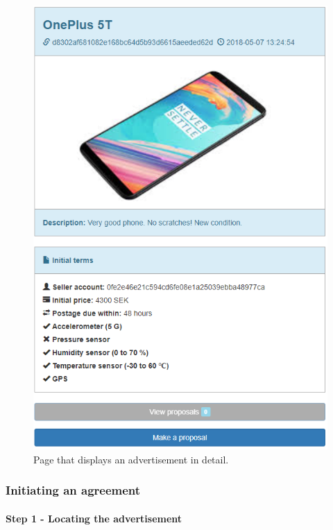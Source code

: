 \begin{figure}[H]
\centering
\includegraphics[scale=0.58]{app_screens/item_display.png}
\caption{Page that displays an advertisement in detail.}
\label{fig:itemdisplay}
\end{figure}

\subsubsection{Initiating an agreement} \label{section:initiation}

\paragraph{Step 1 - Locating the advertisement}

